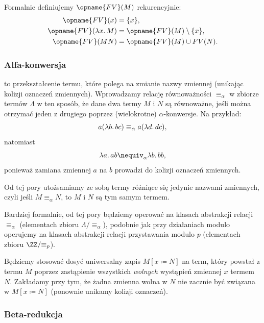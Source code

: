 \documentclass[polish,pretty,bibliography=totocnumbered]{angav}
\newcommand{\FV}{\opname{FV}}
\begin{document}
\begin{remark}
    Formalnie definiujemy $\FV(M)$ rekurencyjnie:
    \begin{align*}
        \FV(x) &= \{x\}, \\
        \FV(\lambda x\ldotp M) &= \FV(M) \setminus \{x\}, \\
        \FV(MN) &= \FV(M) \cup FV(N).
    \end{align*}
\end{remark}

\subsubsection{Alfa-konwersja}

 to przekształcenie termu, które polega na zmianie nazwy zmiennej (unikając kolizji oznaczeń zmiennych). Wprowadzamy relację równoważności $\equiv_\alpha$ w zbiorze termów $\Lambda$ w ten sposób, że dane dwa termy $M$ i $N$ są równoważne, jeśli można otrzymać jeden z drugiego poprzez (wielokrotne) $\alpha$-konwersje. Na przykład:
\[ a (\lambda b\ldotp bc) \equiv_\alpha a (\lambda d\ldotp dc), \]
natomiast
\[ \lambda a\ldotp ab \nequiv_\alpha \lambda b\ldotp bb, \]
ponieważ zamiana zmiennej $a$ na $b$ prowadzi do kolizji oznaczeń zmiennych.

Od tej pory utożsamiamy ze sobą termy różniące się jedynie nazwami zmiennych, czyli jeśli $M \equiv_\alpha N$, to $M$ i $N$ są tym samym termem.

\begin{remark}
    Bardziej formalnie, od tej pory będziemy operować na klasach abstrakcji relacji $\equiv_\alpha$ (elementach zbioru $\Lambda/{\equiv_\alpha}$), podobnie jak przy działaniach modulo operujemy na klasach abstrakcji relacji przystawania modulo $p$ (elementach zbioru $\ZZ/{\equiv_p}$).
\end{remark}

Będziemy stosować dosyć uniwersalny zapis $M[x \coloneqq N]$ na term, który powstał z termu $M$ poprzez zastąpienie wszystkich \emph{wolnych} wystąpień zmiennej $x$ termem $N$.
Zakładamy przy tym, że żadna zmienna wolna w $N$ nie zacznie być związana w $M[x \coloneqq N]$ (ponownie unikamy kolizji oznaczeń).

\subsubsection{Beta-redukcja}
\end{document}
